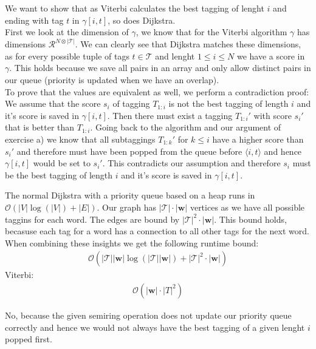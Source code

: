 \documentclass[a4paper,12pt]{ETHexercise}
\begin{document}
\begin{question}
\begin{subquestion}
	\end{subquestion}
	\begin{subquestion}
		We want to show that as Viterbi calculates the best tagging of lenght $i$ and ending with tag $t$ in $\gamma[i, t]$, so does Dijkstra.\\
		First we look at the dimension of $\gamma$, we know that for the Viterbi algorithm $\gamma$ has dimensions $\mathcal{R}^{N \otimes |\mathcal{T}|}$. We can clearly see that Dijkstra matches these dimensions, as for every possible tuple of tags $t \in \mathcal{T}$ and lenght $1 \leq i \leq N$ we have a score in $\gamma$. This holds because we save all pairs in an array and only allow distinct pairs in our queue (priority is updated when we have an overlap).\\
		To prove that the values are equivalent as well, we perform a contradiction proof:\\
		We assume that the score $s_{i}$ of tagging $T_{1:i}$ is not the best tagging of length $i$ and it's score is saved in $\gamma[i, t]$. Then there must exist a tagging $T_{1:i}'$ with score $s_{i}'$ that is better than $T_{1:i}$. Going back to the algorithm and our argument of exercise a) we know that all subtaggings $T_{1:k}'$ for $k \leq i$ have a higher score than $s_{i}'$ and therefore must have been popped from the queue before $\langle i, t \rangle$ and hence $\gamma[i, t]$ would be set to $s_{i}'$. This contradicts our assumption and therefore $s_{i}$ must be the best tagging of length $i$ and it's score is saved in $\gamma[i, t]$.
	\end{subquestion}
	\begin{subquestion}
		The normal Dijkstra with a priority queue based on a heap runs in $\mathcal{O}(|V| \log(|V|) + |E|)$. Our graph has $|\mathcal{T}| \cdot |\mathbf{w}|$ vertices as we have all possible taggins for each word. The edges are bound by $|\mathcal{T}|^2 \cdot |\mathbf{w}|$. This bound holds, becasuse each tag for a word has a connection to all other tags for the next word. When combining these insights we get the following runtime bound:
		\begin{align}
			\mathcal{O}(|\mathcal{T}||\mathbf{w}| \log(|\mathcal{T}||\mathbf{w}|) + |\mathcal{T}|^2 \cdot |\mathbf{w}|)
		\end{align}
		Viterbi:
		\begin{align}
			\mathcal{O}(|\mathbf{w}| \cdot |T|^2)
		\end{align}
	\end{subquestion}
	\begin{subquestion}
		No, because the given semiring operation does not update our priority queue correctly and hence we would not always have the best tagging of a given lenght $i$ popped first.
	\end{subquestion}
\end{question}
\end{document}
